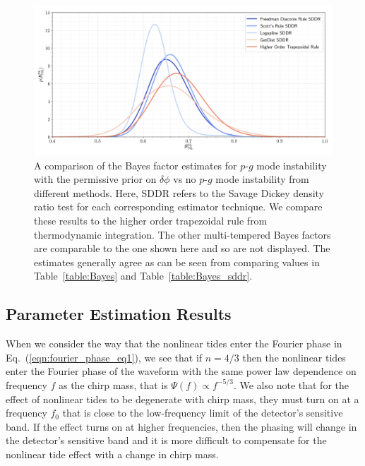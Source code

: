 \begin{figure}[th]
\centering
\includegraphics[width=1.0\textwidth]{figs/chapter6/sddr_bayes_factor.png}
\caption{A comparison of the Bayes factor estimates for $p$-$g$ mode instability with the permissive prior on $\delta \phi$ vs no $p$-$g$ mode instability from different methods. Here, SDDR refers to the Savage Dickey density ratio test for each corresponding estimator technique. We compare these results to the higher order trapezoidal rule from thermodynamic integration. The other multi-tempered Bayes factors are comparable to the one shown here and so are not displayed. The estimates generally agree as can be seen from comparing values in Table~\ref{table:Bayes} and Table~\ref{table:Bayes_sddr}.}
\label{fig:sddr_bayes_factor_comparisons}
\end{figure}


\subsection{Parameter Estimation Results}
When we consider the way that the nonlinear tides enter the Fourier phase in Eq.~(\ref{eqn:fourier_phase_eq1}), we see that if $n = 4/3$ then the nonlinear tides enter the Fourier phase of the waveform with the same power law dependence on frequency $f$ as the chirp mass, that is $\Psi(f) \propto f^{-5/3}$. We also note that for the effect of nonlinear tides to be degenerate with chirp mass, they must turn on at a frequency $f_0$ that is close to the low-frequency limit of the detector's sensitive band. If the effect turns on at higher frequencies, then the phasing will change in the detector's sensitive band and it is more difficult to compensate for the nonlinear tide effect with a change in chirp mass. 

